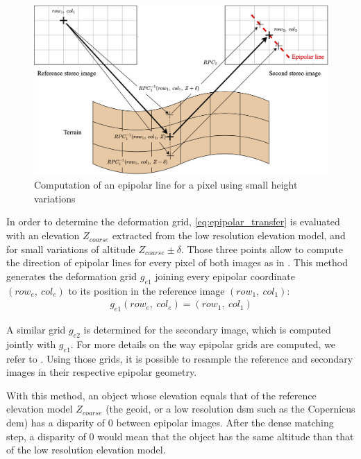 \begin{figure}
    \centering
    \includegraphics[width=\linewidth]{Images/Chap_1/epipolar_lines.png}
    \caption{Computation of an epipolar line for a pixel using small height variations}
    \label{fig:epipolar_lines}
\end{figure}

In order to determine the deformation grid, \cref{eq:epipolar_transfer} is evaluated with an elevation $Z_{coarse}$ extracted from the low resolution elevation model, and for small variations of altitude $Z_{coarse}\pm\delta$. Those three points allow to compute the direction of epipolar lines for every pixel of both images as in . This method generates the deformation grid $g_{e1}$ joining every epipolar coordinate $(row_e, ~col_e)$ to its position in the reference image $(row_1, ~col_1)$:
\begin{align}\label{eq:epipolar_grid}
    g_{e1}(row_e, ~col_e) = (row_1, ~col_1)
\end{align}

A similar grid $g_{e2}$ is determined for the secondary image, which is computed jointly with $g_{e1}$. For more details on the way epipolar grids are computed, we refer to \cite{michel_new_2020}. Using those grids, it is possible to resample the reference and secondary images in their respective epipolar geometry. 

\begin{remark}
    With this method, an object whose elevation equals that of the reference elevation model $Z_{coarse}$ (\ie the geoid, or a low resolution \acrshort{dsm} such as the Copernicus \acrshort{dem}) has a disparity of $0$ between epipolar images. After the dense matching step, a disparity of $0$ would mean that the object has the same altitude than that of the low resolution elevation model.
\end{remark}

